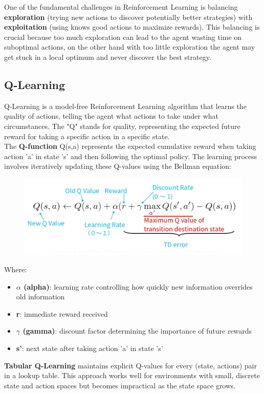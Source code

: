 \documentclass[a4paper,12pt]{article}
\begin{document}
One of the fundamental challenges in Reinforcement Learning is balancing \textbf{exploration} (trying new actions to discover potentially better strategies) with \textbf{exploitation} (using knows good actions to maximize rewards). This balancing is crucial because too much exploration can lead to the agent wasting time on suboptimal actions, on the other hand with too little exploration the agent may get stuck in a local optimum and never discover the best strategy.
\subsection{Q-Learning}
Q-Learning is a model-free Reinforcement Learning algorithm that learns the quality of actions, telling the agent what actions to take under what circumstances. The "Q" stands for quality, representing the expected future reward for taking a specific action in a specific state.\\ The \textbf{Q-function} Q(s,a) represents the expected cumulative reward when taking action 'a' in state 's' and then following the optimal policy. The learning process involves iteratively updating these Q-values using the Bellman equation:
\begin{figure}[H]
    \centering
    \includegraphics[scale=0.5]{bellman.png}
\end{figure}
Where:
\begin{itemize}
    \item \textbf{$\alpha$ (alpha)}: learning rate controlling how quickly new information overrides old information
    \item \textbf{r}: immediate reward received
    \item \textbf{$\gamma$ (gamma)}: discount factor determining the importance of future rewards
    \item \textbf{s'}: next state after taking action 'a' in state 's'
\end{itemize}
\textbf{Tabular Q-Learning} maintains explicit Q-values for every (state, actions) pair in a lookup table. This approach works well for environments with small, discrete state and action spaces but becomes impractical as the state space grows.
\end{document}
